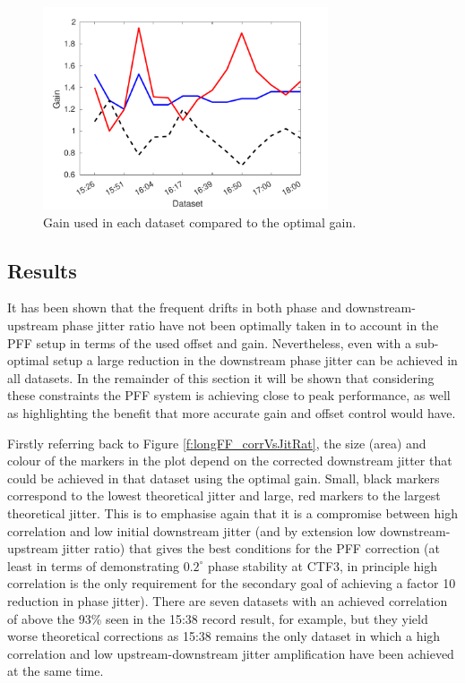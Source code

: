 \begin{figure}
  \centering
  \includegraphics[width=0.75\textwidth]{Figures/feedforward/longFF_gain}
  \caption{Gain used in each dataset compared to the optimal gain.}
  \label{f:longFF_gain}
\end{figure}



\subsection{Results}
\label{ss:longFF_singleResults}

It has been shown that the frequent drifts in both phase and downstream-upstream phase jitter ratio have not been optimally taken in to account in the PFF setup in terms of the used offset and gain. Nevertheless, even with a sub-optimal setup a large reduction in the downstream phase jitter can be achieved in all datasets. In the remainder of this section it will be shown that considering these constraints the PFF system is achieving close to peak performance, as well as highlighting the benefit that more accurate gain and offset control would have.

Firstly referring back to Figure \ref{f:longFF_corrVsJitRat}, the size (area) and colour of the markers in the plot depend on the corrected downstream jitter that could be achieved in that dataset using the optimal gain. Small, black markers correspond to the lowest theoretical jitter and large, red markers to the largest theoretical jitter. This is to emphasise again that it is a compromise between high correlation and low initial downstream jitter (and by extension low downstream-upstream jitter ratio) that gives the best conditions for the PFF correction (at least in terms of demonstrating \(0.2^\circ\) phase stability at CTF3, in principle high correlation is the only requirement for the secondary goal of achieving a factor 10 reduction in phase jitter). There are seven datasets with an achieved correlation of above the 93\% seen in the 15:38 record result, for example, but they yield worse theoretical corrections as 15:38 remains the only dataset in which a high correlation and low upstream-downstream jitter amplification have been achieved at the same time.

